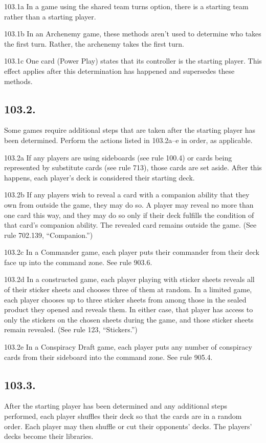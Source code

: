 103.1a In a game using the shared team turns option, there is a starting team rather than a starting player.

103.1b In an Archenemy game, these methods aren’t used to determine who takes the first turn. Rather, the archenemy takes the first turn.

103.1c One card (Power Play) states that its controller is the starting player. This effect applies after this determination has happened and supersedes these methods.

\subsection*{103.2.}
Some games require additional steps that are taken after the starting player has been determined. Perform the actions listed in 103.2a–e in order, as applicable.

103.2a If any players are using sideboards (see rule 100.4) or cards being represented by substitute cards (see rule 713), those cards are set aside. After this happens, each player’s deck is considered their starting deck.

103.2b If any players wish to reveal a card with a companion ability that they own from outside the game, they may do so. A player may reveal no more than one card this way, and they may do so only if their deck fulfills the condition of that card’s companion ability. The revealed card remains outside the game. (See rule 702.139, “Companion.”)

103.2c In a Commander game, each player puts their commander from their deck face up into the command zone. See rule 903.6.

103.2d In a constructed game, each player playing with sticker sheets reveals all of their sticker sheets and chooses three of them at random. In a limited game, each player chooses up to three sticker sheets from among those in the sealed product they opened and reveals them. In either case, that player has access to only the stickers on the chosen sheets during the game, and those sticker sheets remain revealed. (See rule 123, “Stickers.”)

103.2e In a Conspiracy Draft game, each player puts any number of conspiracy cards from their sideboard into the command zone. See rule 905.4.

\subsection*{103.3.}
After the starting player has been determined and any additional steps performed, each player shuffles their deck so that the cards are in a random order. Each player may then shuffle or cut their opponents’ decks. The players’ decks become their libraries.


